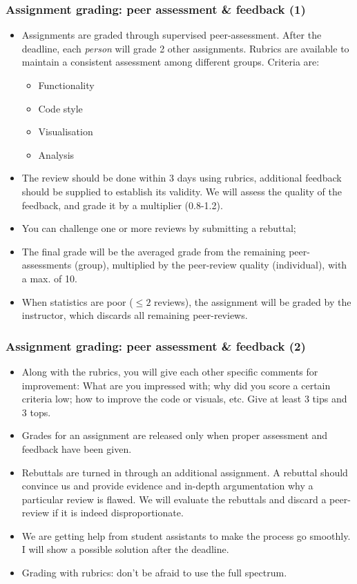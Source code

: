 \begin{frame}
  \frametitle{Assignment grading: peer assessment \& feedback (1)}
  \begin{itemize}
    \item Assignments are graded through supervised peer-assessment. After the deadline, each \emph{person} will grade 2 other assignments. Rubrics are available to maintain a consistent assessment among different groups. Criteria are:
      \begin{itemize}
        \item Functionality
        \item Code style
        \item Visualisation
        \item Analysis
      \end{itemize}
    \item The review should be done within 3 days using rubrics, additional feedback should be supplied to establish its validity. We will assess the quality of the feedback, and grade it by a multiplier (0.8-1.2).
    \item You can challenge one or more reviews by submitting a rebuttal; 
    \item The final grade will be the averaged grade from the remaining peer-assessments (group), multiplied by the peer-review quality (individual), with a max. of 10.
    \item When statistics are poor ($\leq 2$ reviews), the assignment will be graded by the instructor, which discards all remaining peer-reviews.
  \end{itemize}
\end{frame}

\begin{frame}
\frametitle{Assignment grading: peer assessment \& feedback (2)}
\begin{itemize}
  \item Along with the rubrics, you will give each other specific comments for improvement: What are you impressed with; why did you score a certain criteria low; how to improve the code or  visuals, etc. Give at least 3 tips and 3 tops.
  \item Grades for an assignment are released only when proper assessment and feedback have been given.
  \item Rebuttals are turned in through an additional assignment. A rebuttal should convince us and provide evidence and in-depth argumentation why a particular review is flawed. We will evaluate the rebuttals and discard a peer-review if it is indeed disproportionate.
  \item We are getting help from student assistants to make the process go smoothly. I will show a possible solution after the deadline.
  \item Grading with rubrics: don't be afraid to use the full spectrum.
\end{itemize}

\end{frame}

